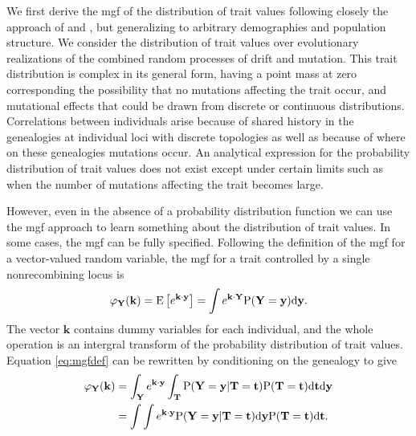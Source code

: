 We first derive the mgf of the distribution of trait values following closely
the approach of \citet{Schraiber2015} and \citet{Khaitovich2005}, but
generalizing to arbitrary demographies and population structure. We consider the
distribution of trait values over evolutionary realizations of the combined
random processes of drift and mutation. This trait distribution is complex in
its general form, having a point mass at zero corresponding the possibility that
no mutations affecting the trait occur, and mutational effects that could be
drawn from discrete or continuous distributions. Correlations between
individuals arise because of shared history in the genealogies at individual
loci with discrete topologies as well as because of where on these genealogies
mutations occur. An analytical expression for the probability distribution of
trait values does not exist except under certain limits such as when the number
of mutations affecting the trait becomes large.

However, even in the absence of a probability distribution function we can use
the mgf approach to learn something about the distribution of trait values. In
some cases, the mgf can be fully specified. Following the definition of the mgf
for a vector-valued random variable, the mgf for a trait controlled by a single
nonrecombining locus is
\begin{equation}
  \label{eq:mgfdef}
  \varphi_{\mathbf{Y}}(\mathbf{k}) = \mathrm{E}\left[ e^{\mathbf{k} \cdot \mathbf{y}} \right] =
  \int e^{\mathbf{k} \cdot \mathbf{Y}} \mathrm{P}(\mathbf{Y}=\mathbf{y}) \mbox{d}\mathbf{y}.
\end{equation}
The vector $\mathbf{k}$ contains dummy variables for each individual, and the
whole operation is an intergral transform of the probability distribution of
trait values. Equation \eqref{eq:mgfdef} can be rewritten by conditioning on the
genealogy to give
\begin{align}
  \label{eq:cond}
  \varphi_{\mathbf{Y}}(\mathbf{k}) &= \int_{\mathbf{Y}} e^{\mathbf{k} \cdot \mathbf{y}}
  \int_{\mathbf{T}} \mathrm{P}(\mathbf{Y}=\mathbf{y} | \mathbf{T}=\mathbf{t}) \mathrm{P}(\mathbf{T}=\mathbf{t})
  \mbox{d}\mathbf{t} \mbox{d}\mathbf{y} \nonumber \\
  &= \int \int e^{\mathbf{k} \cdot \mathbf{y}} \mathrm{P}(\mathbf{Y}=\mathbf{y} | \mathbf{T}=\mathbf{t}) \mbox{d}\mathbf{y}
  \mathrm{P}(\mathbf{T}=\mathbf{t})
  \mbox{d}\mathbf{t}.
\end{align}

